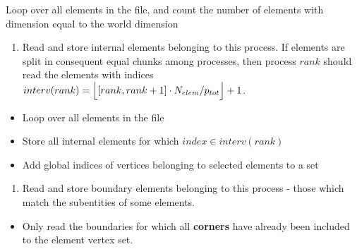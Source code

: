\documentclass[12pt]{article}
\DeclarePairedDelimiter{\floor}{\lfloor}{\rfloor}
\begin{document}
\begin{mybox}
Loop over all elements in the file, and count the number of elements with dimension equal to the world dimension
\end{mybox}	
\begin{enumerate}[resume]	
	\item Read and store internal elements belonging to this process. If elements are split in consequent equal chunks among processes, then process $rank$ should read the elements with indices $interv(rank) = \floor[\Big]{ [rank, rank+1] \cdot N_{elem} / p_{tot} } + 1$.
\end{enumerate}

\begin{mybox}
\begin{itemize}
	\item Loop over all elements in the file
	\item Store all internal elements for which $index \in interv(rank)$
	\item Add global indices of vertices belonging to selected elements to a set
\end{itemize}

\end{mybox}		


\begin{enumerate}[resume]
	\item Read and store boundary elements belonging to this process - those which match the subentities of some elements.
\end{enumerate}
\begin{mybox}
	\begin{itemize}
		\item Only read the boundaries for which all \textbf{corners} have already been included to the element vertex set. 
	\end{itemize}
\end{mybox}	
\end{document}
